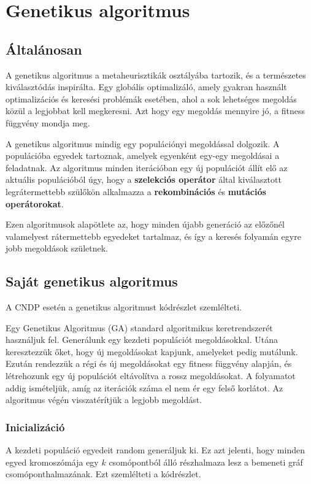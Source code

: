 \section{Genetikus algoritmus}\label{sec:GENETIKUS_ALGORITMUS}


\subsection{Általánosan}
A genetikus algoritmus a metaheurisztikák osztályába tartozik, és a természetes kiválasztódás inspirálta.
Egy globális optimalizáló, amely gyakran használt optimalizációs és keresési problémák esetében,
ahol a sok lehetséges megoldás közül a legjobbat kell megkeresni.
Azt hogy egy megoldás mennyire jó, a fitness függvény mondja meg.

A genetikus algoritmus mindig egy populációnyi megoldással dolgozik.
A populációba egyedek tartoznak, amelyek egyenként egy-egy megoldásai a feladatnak.
Az algoritmus minden iterációban egy új populációt állít elő az aktuális populációból úgy,
hogy a \textbf{szelekciós operátor} által kiválasztott legrátermettebb szülőkön alkalmazza a
\textbf{rekombinációs} és \textbf{mutációs operátorokat}.

Ezen algoritmusok alapötlete az, hogy minden újabb generáció
az előzőnél valamelyest rátermettebb egyedeket tartalmaz, és így a keresés folyamán
egyre jobb megoldások születnek.

\subsection{Saját genetikus algoritmus}
A CNDP esetén a genetikus algoritmust  kódrészlet szemlélteti.


Egy Genetikus Algoritmus (GA) standard algoritmikus keretrendszerét használjuk fel.
Generálunk egy kezdeti populációt megoldásokkal. Utána keresztezzük őket, hogy új megoldásokat kapjunk,
amelyeket pedig mutálunk. Ezután rendezzük a régi és új megoldásokat egy fitness függvény alapján,
és létrehozunk egy új populációt eltávolítva a rossz megoldásokat.
A folyamatot addig ismételjük, amíg az iterációk száma el nem ér egy felső korlátot.
Az algoritmus végén visszatérítjük a legjobb megoldást.

\subsubsection{Inicializáció}
A kezdeti populáció egyedeit random generáljuk ki. Ez azt jelenti,
hogy minden egyed kromoszómája egy $k$ csomópontból álló részhalmaza lesz
a bemeneti gráf csomóponthalmazának. Ezt szemlélteti a  kódrészlet.


